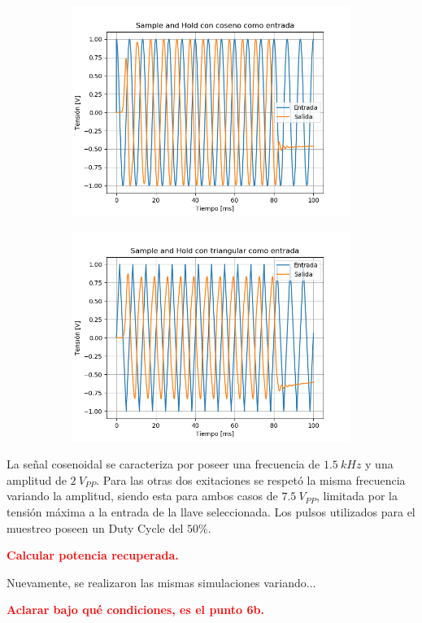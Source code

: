 \begin{figure}[H]
\centering
\begin{subfigure}{.49\textwidth}
	\centering
	\includegraphics[width=\textwidth]{ImagenesEjercicio6/SH - Cos.png}
\end{subfigure}
\begin{subfigure}{.49\textwidth}
	\centering
	\includegraphics[width=\textwidth]{ImagenesEjercicio6/SH - Tri.png}
\end{subfigure}
\end{figure} 

La señal cosenoidal se caracteriza por poseer una frecuencia de $1.5 \ kHz$ y una amplitud de $2 \ V_{PP}$. Para las otras dos exitaciones se respetó la misma frecuencia variando la amplitud, siendo esta para ambos casos de $7.5 \ V_{PP}$, limitada por la tensión máxima a la entrada de la llave seleccionada. Los pulsos utilizados para el muestreo poseen un Duty Cycle del $50 \%$.

\textcolor{red}{\textbf{Calcular potencia recuperada.}}


Nuevamente, se realizaron las mismas simulaciones variando...

\textcolor{red}{\textbf{Aclarar bajo qué condiciones, es el punto 6b.}}



